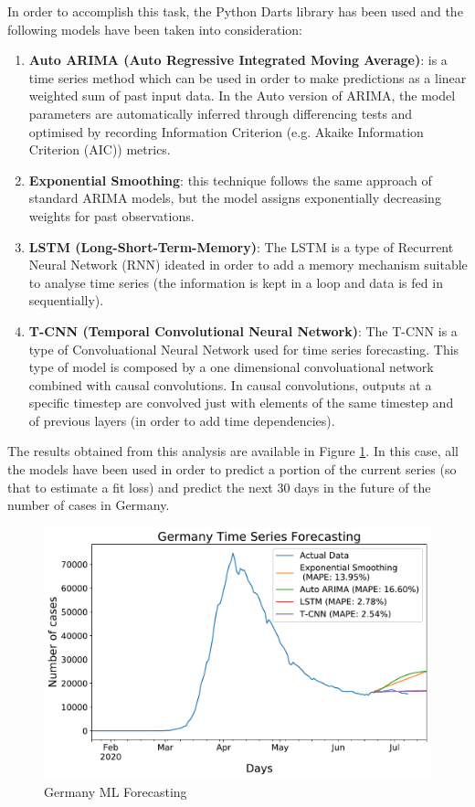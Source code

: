 In order to accomplish this task, the Python Darts library \cite{darts} has been used and the following models have been taken into consideration:
\begin{enumerate}
    \item \textbf{Auto ARIMA (Auto Regressive Integrated Moving Average)}: is a time series method which can be used in order to make predictions as a linear weighted sum of past input data. In the Auto version of ARIMA, the model parameters are automatically inferred through differencing tests and optimised by recording Information Criterion (e.g. Akaike Information Criterion (AIC)) metrics.
    \item \textbf{Exponential Smoothing}: this technique follows the same approach of standard ARIMA models, but the model assigns exponentially decreasing weights for past observations.
    \item \textbf{LSTM (Long-Short-Term-Memory)}: The LSTM is a type of Recurrent Neural Network (RNN) ideated in order to add a memory mechanism suitable to analyse time series (the information is kept in a loop and data is fed in sequentially).
    \item \textbf{T-CNN (Temporal Convolutional Neural Network)}: The T-CNN is a type of Convoluational Neural Network used for time series forecasting. This type of model is composed by a one dimensional convoluational network combined with causal convolutions. In causal convolutions, outputs at a specific timestep are convolved just with elements of the same timestep and of previous layers (in order to add time dependencies).
\end{enumerate}

The results obtained from this analysis are available in Figure \ref{ml_forecast}. In this case, all the models have been used in order to predict a portion of the current series (so that to estimate a fit loss) and predict the next 30 days in the future of the number of cases in Germany.

\begin{figure}[ht!]%
    \centering
    \includegraphics[width=0.55\linewidth]{latex/images/Germany_darts.pdf}
    \vspace{-0.2cm}
    \caption{Germany ML Forecasting}
    \label{ml_forecast}
\end{figure}

